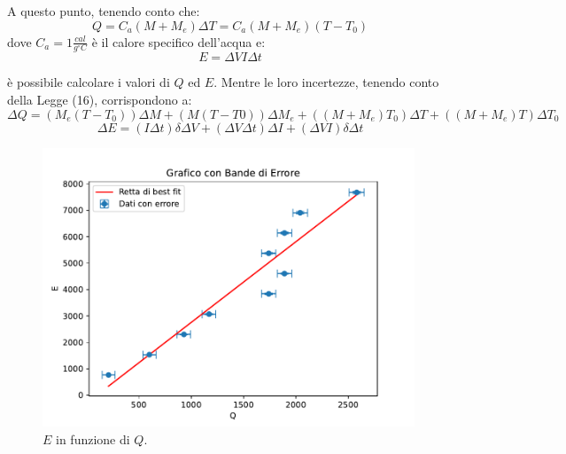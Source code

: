 A questo punto, tenendo conto che:                    
\begin{equation}
	Q=C_a(M+M_e)\Delta T = C_a(M+M_e)(T-T_0)
\end{equation}
dove $C_a=1 \frac{cal}{g^{\circ}C}$ è il calore specifico dell'acqua e:
\begin{equation}
	E=\Delta VI\Delta t
\end{equation} 

è possibile calcolare i valori di $Q$ ed $E$. Mentre le loro incertezze, tenendo conto della Legge (16), corrispondono a:
\begin{equation}
	\Delta Q = (M_e(T-T_0))\Delta M+(M(T-T0))\Delta M_e+((M+M_e)T_0)\Delta T+((M+M_e)T)\Delta T_0
\end{equation}
\begin{equation}
	\Delta E = (I\Delta t)\delta \Delta V+(\Delta V \Delta t)\Delta I+(\Delta VI)\delta \Delta t
\end{equation}

\begin{figure}[H]
	\centering
	\includegraphics[width=0.99\textwidth]{./figures/grafico1}
	\caption{$E$ in funzione di $Q$.}
\end{figure}
